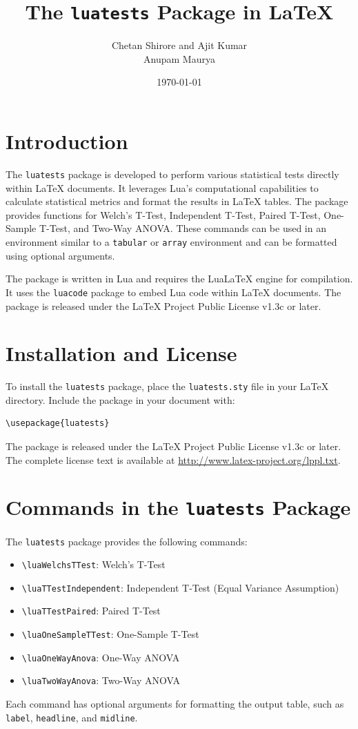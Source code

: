 \documentclass{article}
\title{The \texttt{luatests} Package in LaTeX}
\author{Chetan Shirore and Ajit Kumar\\Anupam Maurya}
\date{\today}
\begin{document}
\maketitle
\section{Introduction}

The \texttt{luatests} package is developed to perform various statistical tests directly within LaTeX documents. It leverages Lua's computational capabilities to calculate statistical metrics and format the results in LaTeX tables. The package provides functions for Welch's T-Test, Independent T-Test, Paired T-Test, One-Sample T-Test, and Two-Way ANOVA. These commands can be used in an environment similar to a \texttt{tabular} or \texttt{array} environment and can be formatted using optional arguments.

The package is written in Lua and requires the LuaLaTeX engine for compilation. It uses the \texttt{luacode} package to embed Lua code within LaTeX documents. The package is released under the LaTeX Project Public License v1.3c or later.

\section{Installation and License}

To install the \texttt{luatests} package, place the \texttt{luatests.sty} file in your LaTeX directory. Include the package in your document with:

\begin{verbatim}
\usepackage{luatests}
\end{verbatim}

The package is released under the LaTeX Project Public License v1.3c or later. The complete license text is available at \url{http://www.latex-project.org/lppl.txt}.

\section{Commands in the \texttt{luatests} Package}

The \texttt{luatests} package provides the following commands:

\begin{itemize}
    \item \texttt{\textbackslash luaWelchsTTest}: Welch's T-Test
    \item \texttt{\textbackslash luaTTestIndependent}: Independent T-Test (Equal Variance Assumption)
    \item \texttt{\textbackslash luaTTestPaired}: Paired T-Test
    \item \texttt{\textbackslash luaOneSampleTTest}: One-Sample T-Test
    \item \texttt{\textbackslash luaOneWayAnova}: One-Way ANOVA
    \item \texttt{\textbackslash luaTwoWayAnova}: Two-Way ANOVA
\end{itemize}

Each command has optional arguments for formatting the output table, such as \texttt{label}, \texttt{headline}, and \texttt{midline}.

\end{document}
